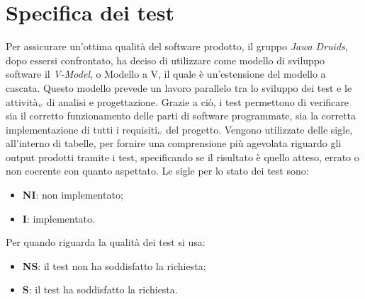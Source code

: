 \chapter{Specifica dei test} \label{SpecificaDeiTest}

Per assicurare un’ottima qualità del software prodotto, il gruppo \textit{Jawa Druids}, dopo essersi confrontato, ha deciso di utilizzare come modello di sviluppo software il \textit{V-Model}, o Modello a V, il quale è un’estensione del modello a cascata.
Questo modello prevede un lavoro parallelo tra lo sviluppo dei test e le attività$_{\scaleto{G}{3pt}}$ di analisi e progettazione.
Grazie a ciò, i test permettono di verificare sia il corretto funzionamento delle parti di software programmate, sia la corretta implementazione di tutti i requisiti$_{\scaleto{G}{3pt}}$ del progetto.
Vengono utilizzate delle sigle, all’interno di tabelle, per fornire una comprensione più agevolata riguardo gli output prodotti tramite i test, specificando se il risultato è quello atteso, errato o non coerente con quanto aspettato.
Le sigle per lo stato dei test sono:
\begin{itemize}
	\item \textbf{NI}: non implementato;
	\item \textbf{I}: implementato.
\end{itemize}
Per quando riguarda la qualità dei test si usa:
\begin{itemize}
	\item \textbf{NS}: il test non ha soddisfatto la richiesta;
	\item \textbf{S}: il test ha soddisfatto la richiesta.
\end{itemize}

